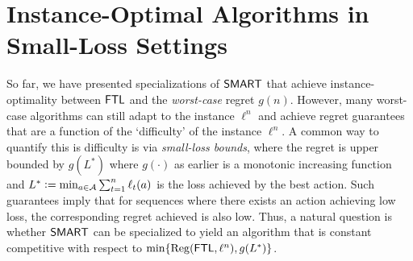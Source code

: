\section{Instance-Optimal Algorithms in Small-Loss Settings} \label{sec:SmallLoss}


So far, we have presented specializations of $\mathsf{SMART}$ that achieve instance-optimality between $\mathsf{FTL}$ and the \emph{worst-case} regret $g(n)$. However, many worst-case algorithms can still adapt to the instance $\ell^n$ and achieve regret guarantees that are a function of the `difficulty' of the instance $\ell^n$. A common way to quantify this is difficulty is via \emph{small-loss bounds}, where the regret is upper bounded by $g(L^*)$ where $g(\cdot)$ as earlier is a monotonic increasing function and $L^* \mathrel{\mathop{:}}= \min_{a \in \mathcal{A}} \sum_{t=1}^n \ell_{t}(a)$ is the loss achieved by the best action. Such guarantees imply that for sequences where there exists an action achieving low loss, the corresponding regret achieved is also low. Thus, a natural question is whether $\mathsf{SMART}$ can be specialized to yield an algorithm that is constant competitive with respect to $\min\{\mathrm{Reg}(\mathsf{FTL}, \ell^n), g(L^*)\}$.  

